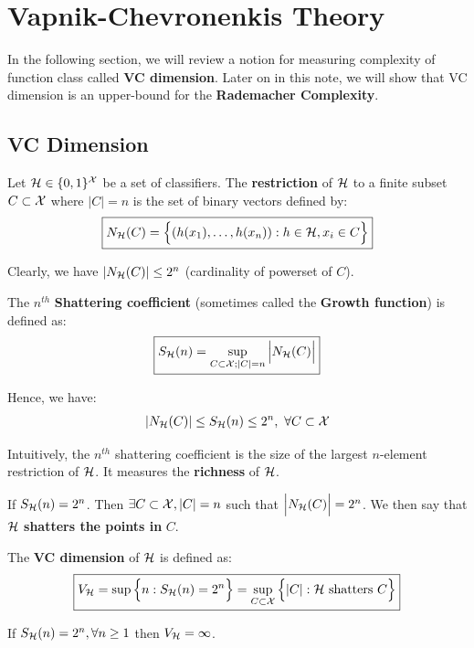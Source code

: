 \newpage\section{Vapnik-Chevronenkis Theory}
In the following section, we will review a notion for measuring complexity of function class called \textbf{VC dimension}. Later on in this note, we will show that VC dimension is an upper-bound for the \textbf{Rademacher Complexity}.

\subsection{VC Dimension}
\begin{definition}
    Let $\mathcal{H} \in \{0,1\}^{\mathcal{X}}$ be a set of classifiers. The \textbf{restriction} of $\mathcal{H}$ to a finite subset $C\subset\mathcal{X}$ where $|C| = n$ is the set of binary vectors defined by:
    \begin{align*}
        \boxed{
        N_{\mathcal{H}}(C) = \Big\{ 
            (h(x_1), \dots, h(x_n)) : h\in\mathcal{H}, x_i \in C
         \Big\} 
        }
    \end{align*}

    \noindent Clearly, we have $|N_{\mathcal{H}}(C)| \le 2^n$ (cardinality of powerset of $C$).
\end{definition}

\begin{definition}
    The $n^{th}$ \textbf{Shattering coefficient} (sometimes called the \textbf{Growth function}) is defined as:
    \begin{align*}
        \boxed{S_{\mathcal{H}}(n) = \sup_{C\subset\mathcal{X}; |C|=n} \Big| N_{\mathcal{H}} (C) \Big|}
    \end{align*}

    \noindent Hence, we have:
    \begin{align*}
        |N_{\mathcal{H}}(C)| \le S_{\mathcal{H}}(n) \le 2^n, \ \forall C \subset \mathcal{X}
    \end{align*}

    \noindent Intuitively, the $n^{th}$ shattering coefficient is the size of the largest $n$-element restriction of $\mathcal{H}$. It measures the \textbf{richness} of $\mathcal{H}$.

    \noindent\newline If $S_{\mathcal{H}}(n)=2^n$. Then $\exists C\subset\mathcal{X}, |C|=n$ such that $\Big| N_{\mathcal{H}}(C) \Big|=2^n$. We then say that $\mathcal{H}$ \textbf{shatters the points in} $C$.
\end{definition}

\begin{definition}[VC-dimension ($V_\Hf$)]
    The \textbf{VC dimension} of $\mathcal{H}$ is defined as:
    \begin{align*}
        \boxed{V_{\mathcal{H}} = \sup\Big\{ 
            n : S_{\mathcal{H}} (n) = 2^n
         \Big\}=\sup_{C\subset \mathcal{X}}\Big\{ 
            |C| : \mathcal{H} \text{ shatters } C
         \Big\}}
    \end{align*}

    \noindent If $S_{\mathcal{H}}(n)=2^n, \forall n \ge 1$ then $V_{\mathcal{H}}=\infty$.  
\end{definition}

